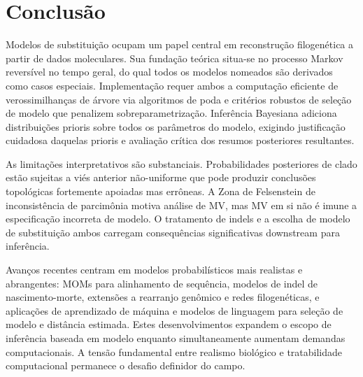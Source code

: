 \section{Conclusão}

Modelos de substituição ocupam um papel central em reconstrução filogenética a partir de dados moleculares. Sua fundação teórica situa-se no processo Markov reversível no tempo geral, do qual todos os modelos nomeados são derivados como casos especiais. Implementação requer ambos a computação eficiente de verossimilhanças de árvore via algoritmos de poda e critérios robustos de seleção de modelo que penalizem sobreparametrização. Inferência Bayesiana adiciona distribuições prioris sobre todos os parâmetros do modelo, exigindo justificação cuidadosa daquelas prioris e avaliação crítica dos resumos posteriores resultantes.

As limitações interpretativos são substanciais. Probabilidades posteriores de clado estão sujeitas a viés anterior não-uniforme que pode produzir conclusões topológicas fortemente apoiadas mas errôneas. A Zona de Felsenstein de inconsistência de parcimônia motiva análise de MV, mas MV em si não é imune a especificação incorreta de modelo. O tratamento de indels e a escolha de modelo de substituição ambos carregam consequências significativas downstream para inferência.

Avanços recentes centram em modelos probabilísticos mais realistas e abrangentes: MOMs para alinhamento de sequência, modelos de indel de nascimento-morte, extensões a rearranjo genômico e redes filogenéticas, e aplicações de aprendizado de máquina e modelos de linguagem para seleção de modelo e distância estimada. Estes desenvolvimentos expandem o escopo de inferência baseada em modelo enquanto simultaneamente aumentam demandas computacionais. A tensão fundamental entre realismo biológico e tratabilidade computacional permanece o desafio definidor do campo.

